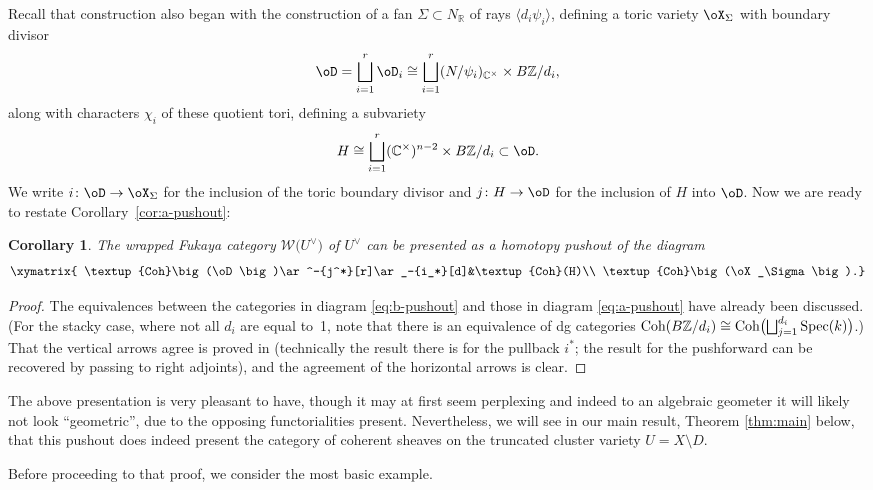 \documentclass[pdftex]{sigma}%
\numberwithin{equation}{section}
\newtheorem{Corollary}[Theorem]{Corollary}
\def\CC{\mathbb{C}}
\def\RR{\mathbb{R}}
\def\ZZ{\mathbb{Z}}
\def\cW{\mathcal{W}}
\newcommand{\Coh}{\textup{Coh}}
\newcommand\Spec{\textup{Spec}}
\begin{document}
Recall that construction also began with the construction of a fan $\Sigma\subset N_\RR$ of rays $\langle d_i\psi_i\rangle$, defining a toric variety $\oX_\Sigma$ with boundary divisor
\[
\oD=\bigsqcup_{i=1}^r \oD_i\cong \bigsqcup_{i=1}^r(N/\psi_i)_{\CC^\times}\times B\ZZ/d_i,
\]
along with characters $\chi_i$ of these quotient tori,
defining a subvariety
\[
H\cong \bigsqcup_{i=1}^r (\CC^\times)^{n-2}\times B\ZZ/d_i\subset \oD.
\]
We write $i\colon\oD\to \oX_\Sigma$ for the inclusion of the toric boundary divisor and $j\colon H\to \oD$ for the inclusion of $H$ into $\oD$. Now we are ready to restate Corollary~\ref{cor:a-pushout}:
\begin{Corollary}\label{cor:b-pushout}
 The wrapped Fukaya category $\cW\big(U^\vee\big)$ of $U^\vee$ can be presented as a homotopy pushout of the diagram
 \begin{equation}
 \xymatrix{
 \Coh\big(\oD\big)\ar^-{j^*}[r]\ar_-{i_*}[d]&\Coh(H)\\
 \Coh\big(\oX_\Sigma\big).}
 \label{eq:b-pushout}
 \end{equation}
\end{Corollary}
\begin{proof}
 The equivalences between the categories in diagram \eqref{eq:b-pushout} and those in diagram \eqref{eq:a-pushout} have already been discussed. \big(For the stacky case, where not all $d_i$ are equal to~1, note that there is an equivalence of dg categories $\Coh(B\ZZ/d_i)\cong \Coh\bigl( \bigsqcup_{j=1}^{d_i}\Spec(k) \bigr)$.\big) That the vertical arrows agree is proved in \cite[Section~7.2]{GS17} (technically the result there is for the pullback $i^*$; the result for the pushforward can be recovered by passing to right adjoints), and the agreement of the horizontal arrows is clear.
\end{proof}
The above presentation is very pleasant to have, though it may at first seem perplexing and indeed to an algebraic geometer it will likely not look ``geometric'', due to the opposing functorialities present. Nevertheless, we will see in our main result, Theorem \ref{thm:main} below, that this pushout does indeed present the category of coherent sheaves on the truncated cluster variety $U=X\setminus D$.

Before proceeding to that proof, we consider the most basic example.
\end{document}

